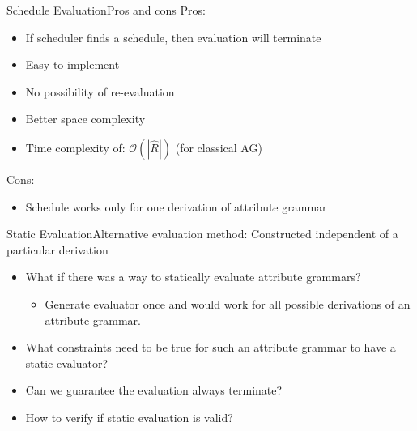 


\begin{frame}{Schedule Evaluation}{Pros and cons}
Pros:
\begin{itemize}
    \item If scheduler finds a schedule, then evaluation \alert{will terminate}
    \item Easy to implement
    \item \alert{No possibility of re-evaluation}
    \item Better space complexity
    \item Time complexity of: $\mathcal{O}(| \hat{R} |)$ (for classical AG)
\end{itemize}

Cons:
\begin{itemize}
    \item Schedule \alert{works only for one derivation} of attribute grammar
\end{itemize}
\end{frame}







\begin{frame}{Static Evaluation}{Alternative evaluation method: Constructed independent of a particular derivation}

\begin{itemize}
    \item What if there was a way to \alert{statically} evaluate attribute grammars?
    \begin{itemize}
        \item Generate evaluator \alert{once} and would \alert{work for all possible derivations} of an attribute grammar.
    \end{itemize}
    \item What \alert{constraints} need to be true for such an attribute grammar to have a static evaluator?
    \item Can we guarantee the evaluation always \alert{terminate}?
    \item How to verify if static evaluation is \alert{valid}?
\end{itemize}
\end{frame}

